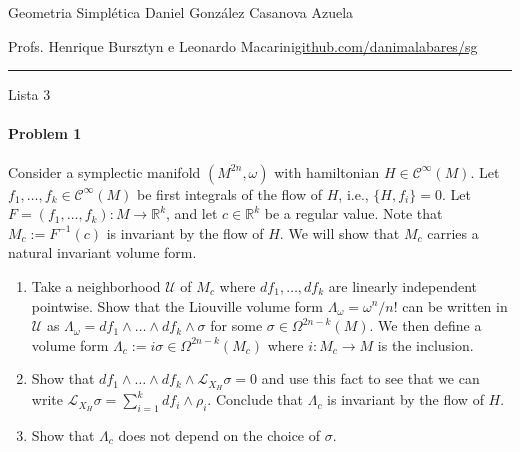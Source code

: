 
%



\begin{minipage}{\textwidth}
	\begin{minipage}{1\textwidth}
		Geometria Simpl\'etica \hfill Daniel González Casanova Azuela
		
		{\small Profs. Henrique Bursztyn e Leonardo Macarini\hfill\href{https://github.com/danimalabares/sg}{github.com/danimalabares/sg}}
	\end{minipage}
\end{minipage}\vspace{.2cm}\hrule

\vspace{10pt}
{\huge Lista 3}

\tableofcontents

\paragraph{Problem 1} Consider a symplectic manifold $(M^{2n},\omega)$ with hamiltonian $H\in\mathcal{C}^\infty(M)$. Let $f_1,\ldots,f_k\in\mathcal{C}^\infty(M)$ be first integrals of the flow of $H$, i.e., $\{H,f_i\} =0$. Let $F=(f_1,\ldots,f_k):M\longrightarrow \mathbb{R}^{k}$, and let $c \in\mathbb{R}^{k}$ be a regular value. Note that $M_c:=F^{-1}(c)$ is invariant by the flow of $H$. We will show that  $M_c$ carries a natural invariant volume form.
\begin{enumerate}[label=\alph*.]
	\item Take a neighborhood $\mathcal{U}$ of $M_{c}$ where $df_1,\ldots,df_k$ are linearly independent pointwise. Show that the Liouville volume form $\Lambda_\omega=\omega^n/n!$ can be written in $\mathcal{U}$ as $\Lambda_\omega=df_1\wedge \ldots \wedge df_k\wedge \sigma$ for some $\sigma\in\Omega^{2n-k}(M)$. We then define a volume form $\Lambda_c:= i\sigma\in\Omega^{2n-k}(M_c)$ where $i:M_c\to M$ is the inclusion.
	\item Show that $df_1\wedge \ldots \wedge df_k\wedge  \mathcal{L}_{X_H}\sigma=0$ and use this fact to see that we can write $\mathcal{L}_{X_H}\sigma=\sum_{i=1}^kdf_i\wedge \rho_i$. Conclude that $\Lambda_c$ is invariant by the flow of $H$.
	 \item Show that $\Lambda_c$ does not depend on the choice of $\sigma$.
\end{enumerate}


